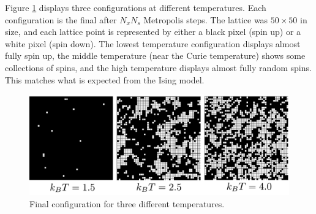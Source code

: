 \documentclass[12pt,oneside,a4paper]{article}
\begin{document}
Figure \ref{fig:mag50x50} displays three configurations at different temperatures.  Each configuration is the final after $N_x N_s$ Metropolis steps.  The lattice was $50\times50$ in size, and each lattice point is represented by either a black pixel (spin up) or a white pixel (spin down).  The lowest temperature configuration displays almost fully spin up, the middle temperature (near the Curie temperature) shows some collections of spins, and the high temperature displays almost fully random spins.  This matches what is expected from the Ising model.
\begin{figure}[!h]
	\centering
	\includegraphics[width=\textwidth]{../results/50x50.pdf}
	\caption{Final configuration for three different temperatures.}
	\label{fig:mag50x50}
\end{figure}
\end{document}
